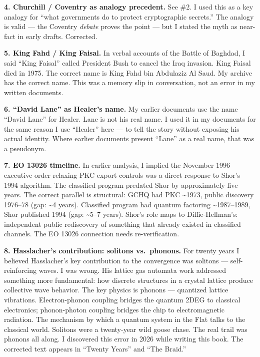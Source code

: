 \textbf{4. Churchill / Coventry as analogy precedent.} See \#2. I used this as a key analogy for ``what governments do to protect cryptographic secrets.'' The analogy is valid --- the Coventry \textit{debate} proves the point --- but I stated the myth as near-fact in early drafts. Corrected.

\textbf{5. King Fahd / King Faisal.} In verbal accounts of the Battle of Baghdad, I said ``King Faisal'' called President Bush to cancel the Iraq invasion. King Faisal died in 1975. The correct name is King Fahd bin Abdulaziz Al Saud. My archive has the correct name. This was a memory slip in conversation, not an error in my written documents.

\textbf{6. ``David Lane'' as Healer's name.} My earlier documents use the name ``David Lane'' for Healer. Lane is not his real name. I used it in my documents for the same reason I use ``Healer'' here --- to tell the story without exposing his actual identity. Where earlier documents present ``Lane'' as a real name, that was a pseudonym.

\textbf{7. EO 13026 timeline.} In earlier analysis, I implied the November 1996 executive order relaxing PKC export controls was a direct response to Shor's 1994 algorithm. The classified program predated Shor by approximately five years. The correct parallel is structural: GCHQ had PKC \textasciitilde{}1973, public discovery 1976--78 (gap: \textasciitilde{}4 years). Classified program had quantum factoring \textasciitilde{}1987--1989, Shor published 1994 (gap: \textasciitilde{}5--7 years). Shor's role maps to Diffie-Hellman's: independent public rediscovery of something that already existed in classified channels. The EO 13026 connection needs re-verification.

\textbf{8. Hasslacher's contribution: solitons vs.\ phonons.} For twenty years I believed Hasslacher's key contribution to the convergence was solitons --- self-reinforcing waves. I was wrong. His lattice gas automata work addressed something more fundamental: how discrete structures in a crystal lattice produce collective wave behavior. The key physics is phonons --- quantized lattice vibrations. Electron-phonon coupling bridges the quantum 2DEG to classical electronics; phonon-photon coupling bridges the chip to electromagnetic radiation. The mechanism by which a quantum system in the Flat talks to the classical world. Solitons were a twenty-year wild goose chase. The real trail was phonons all along. I discovered this error in 2026 while writing this book. The corrected text appears in ``Twenty Years'' and ``The Braid.''

